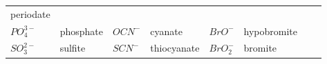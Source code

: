 \documentclass[
  11pt,
  french,
  a4paper,
  openany]{book}
\begin{document}
\begin{longtable}[]{@{}llllllll@{}}
\begin{minipage}[t]{0.09\columnwidth}
periodate\strut
\end{minipage}\tabularnewline
\begin{minipage}[t]{0.11\columnwidth}\raggedright
\(PO_4^{3-}\)\strut
\end{minipage} & \begin{minipage}[t]{0.09\columnwidth}\raggedright
phosphate\strut
\end{minipage} & \begin{minipage}[t]{0.12\columnwidth}\raggedright
\(OCN^{-}\)\strut
\end{minipage} & \begin{minipage}[t]{0.09\columnwidth}\raggedright
cyanate\strut
\end{minipage} & \begin{minipage}[t]{0.09\columnwidth}\raggedright
\(BrO^{-}\)\strut
\end{minipage} & \begin{minipage}[t]{0.10\columnwidth}\raggedright
hypobromite\strut
\end{minipage} & \begin{minipage}[t]{0.09\columnwidth}\raggedright
\strut
\end{minipage} & \begin{minipage}[t]{0.09\columnwidth}\raggedright
\strut
\end{minipage}\tabularnewline
\begin{minipage}[t]{0.11\columnwidth}\raggedright
\(SO_3^{2-}\)\strut
\end{minipage} & \begin{minipage}[t]{0.09\columnwidth}\raggedright
sulfite\strut
\end{minipage} & \begin{minipage}[t]{0.12\columnwidth}\raggedright
\(SCN^{-}\)\strut
\end{minipage} & \begin{minipage}[t]{0.09\columnwidth}\raggedright
thiocyanate\strut
\end{minipage} & \begin{minipage}[t]{0.09\columnwidth}\raggedright
\(BrO_2^{-}\)\strut
\end{minipage} & \begin{minipage}[t]{0.10\columnwidth}\raggedright
bromite\strut
\end{minipage} & \begin{minipage}[t]{0.09\columnwidth}\raggedright
\strut
\end{minipage} & \begin{minipage}[t]{0.09\columnwidth}\raggedright

\end{minipage}
\end{longtable}
\end{document}
